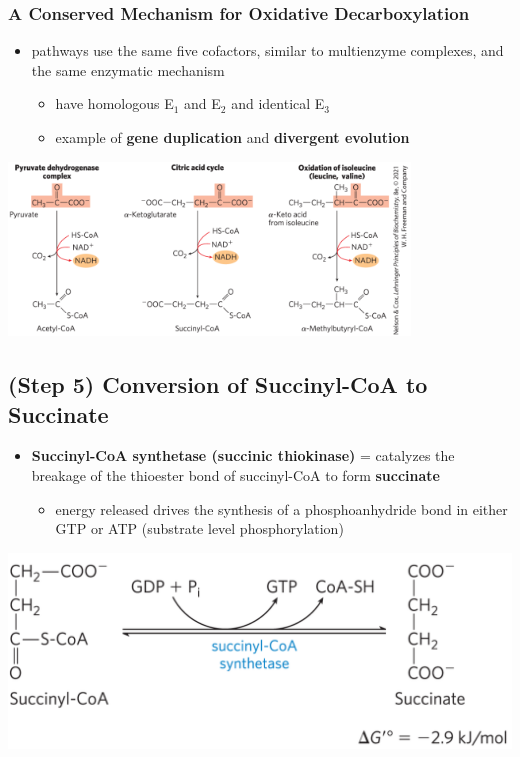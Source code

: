 \documentclass[10pt]{article}
\begin{document}
\subsubsection*{A Conserved Mechanism for Oxidative Decarboxylation}
\begin{itemize}
	\item pathways use the same five cofactors, similar to multienzyme complexes, and the same enzymatic mechanism
	\begin{itemize}
        \item have homologous E$_1$ and E$_2$ and identical E$_3$
        \item example of \textbf{gene duplication} and \textbf{divergent evolution}
    \end{itemize}
\end{itemize}
\begin{center} 
	\includegraphics*[width=0.8\textwidth]{L4_9.png} 
\end{center}

\subsection*{(Step 5) Conversion of Succinyl-CoA to Succinate}
\begin{itemize}
	\item \textbf{Succinyl-CoA synthetase (succinic thiokinase)} = catalyzes the breakage of the thioester bond of succinyl-CoA to form \textbf{succinate}
	\begin{itemize}
        \item energy released drives the synthesis of a phosphoanhydride bond in either GTP or ATP (substrate level phosphorylation)
    \end{itemize}
\end{itemize}
\begin{center} 
	\includegraphics*[width=\textwidth]{L4_10.png} 
\end{center}
\end{document}
